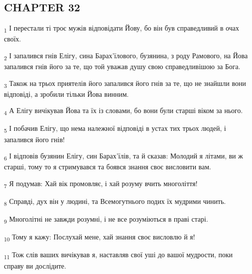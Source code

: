 \subsection{CHAPTER 32}
\begin{tcolorbox}
\textsubscript{1} І перестали ті троє мужів відповідати Йову, бо він був справедливий в очах своїх.
\end{tcolorbox}
\begin{tcolorbox}
\textsubscript{2} І запалився гнів Елігу, сина Барах'їлового, бузянина, з роду Рамового, на Йова запалився гнів його за те, що той уважав душу свою справедливішою за Бога.
\end{tcolorbox}
\begin{tcolorbox}
\textsubscript{3} Також на трьох приятелів його запалився його гнів за те, що не знайшли вони відповіді, а зробили тільки Йова винним.
\end{tcolorbox}
\begin{tcolorbox}
\textsubscript{4} А Елігу вичікував Йова та їх із словами, бо вони були старші віком за нього.
\end{tcolorbox}
\begin{tcolorbox}
\textsubscript{5} І побачив Елігу, що нема належної відповіді в устах тих трьох людей, і запалився його гнів!
\end{tcolorbox}
\begin{tcolorbox}
\textsubscript{6} І відповів бузянин Елігу, син Барах'їлів, та й сказав: Молодий я літами, ви ж старші, тому то я стримувався та боявся знання своє висловити вам.
\end{tcolorbox}
\begin{tcolorbox}
\textsubscript{7} Я подумав: Хай вік промовляє, і хай розуму вчить многоліття!
\end{tcolorbox}
\begin{tcolorbox}
\textsubscript{8} Справді, дух він у людині, та Всемогутнього подих їх мудрими чинить.
\end{tcolorbox}
\begin{tcolorbox}
\textsubscript{9} Многолітні не завжди розумні, і не все розуміються в праві старі.
\end{tcolorbox}
\begin{tcolorbox}
\textsubscript{10} Тому я кажу: Послухай мене, хай знання своє висловлю й я!
\end{tcolorbox}
\begin{tcolorbox}
\textsubscript{11} Тож слів ваших вичікував я, наставляв свої уші до вашої мудрости, поки справу ви дослідите.
\end{tcolorbox}
